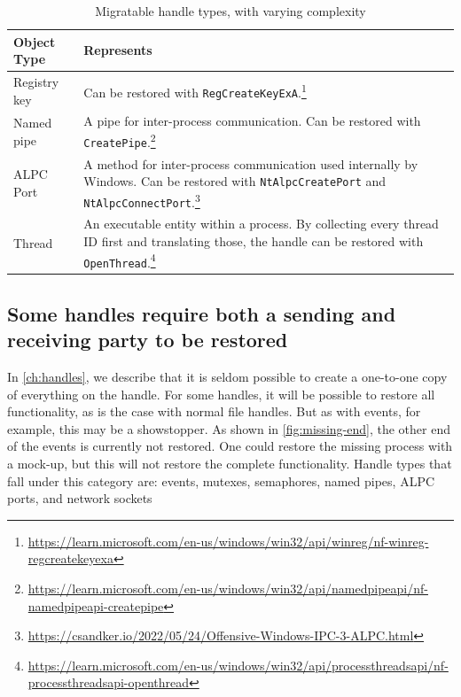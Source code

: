 \documentclass[a4paper, 11pt, english]{report}
\begin{document}
\begin{table}[h]
\begin{tabular}{p{} p{} }
\hline
\textbf{Object Type} & \textbf{Represents} \\
\hline
Registry key & Can be restored with \texttt{RegCreateKeyExA}.\footnote{\url{https://learn.microsoft.com/en-us/windows/win32/api/winreg/nf-winreg-regcreatekeyexa}} \\
Named pipe & A pipe for inter-process communication. Can be restored with  \texttt{CreatePipe}.\footnote{\url{https://learn.microsoft.com/en-us/windows/win32/api/namedpipeapi/nf-namedpipeapi-createpipe}} \\
ALPC Port & A method for inter-process communication used internally by Windows. Can be restored with \texttt{NtAlpcCreatePort} and \texttt{NtAlpcConnectPort}.\footnote{\url{https://csandker.io/2022/05/24/Offensive-Windows-IPC-3-ALPC.html}} \\
Thread & An executable entity within a process. By collecting every thread ID first and translating those, the handle can be restored with \texttt{OpenThread}.\footnote{\url{https://learn.microsoft.com/en-us/windows/win32/api/processthreadsapi/nf-processthreadsapi-openthread}}\\
\hline
\end{tabular}
\caption{Migratable handle types, with varying complexity}
\label{fig:future-handles}
\end{table}

\subsection{Some handles require both a sending and receiving party to be restored}
\label{sec:other-end}
In \autoref{ch:handles}, we describe that it is seldom possible to create a one-to-one copy of everything on the handle. For some handles, it will be possible to restore all functionality, as is the case with normal file handles. But as with events, for example, this may be a showstopper. As shown in \autoref{fig:missing-end}, the other end of the events is currently not restored. One could restore the missing process with a mock-up, but this will not restore the complete functionality. Handle types that fall under this category are: events, mutexes, semaphores, named pipes, ALPC ports, and network sockets
\end{document}
